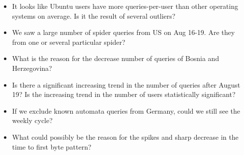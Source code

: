 \documentclass[12pt,]{article}
\providecommand{\tightlist}{%
  \setlength{\itemsep}{0pt}\setlength{\parskip}{0pt}}
\begin{document}
\begin{itemize}
\tightlist
\item
  It looks like Ubuntu users have more queries-per-user than other
  operating systems on average. Is it the result of several outliers?
\item
  We saw a large number of spider queries from US on Aug 16-19. Are they
  from one or several particular spider?
\item
  What is the reason for the decrease number of queries of Bosnia and
  Herzegovina?
\item
  Is there a significant increasing trend in the number of queries after
  August 19? Is the increasing trend in the number of users
  statistically significant?
\item
  If we exclude known automata queries from Germany, could we still see
  the weekly cycle?
\item
  What could possibly be the reason for the spikes and sharp decrease in
  the time to first byte pattern?
\end{itemize}
\end{document}
